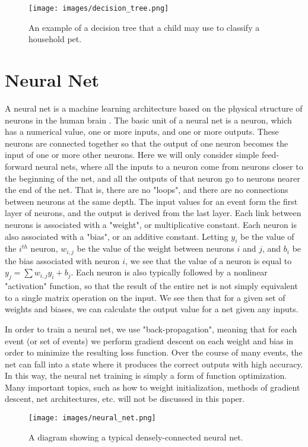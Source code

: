\begin{figure}[t]
    \centering
    \texttt{[image: images/decision\_tree.png]}
    \caption{An example of a decision tree that a child may use to classify a household pet.}
    \label{decision_tree}
\end{figure}

\section{Neural Net}

A neural net is a machine learning architecture based on the physical structure of neurons in the human brain \cite{neural_net}. The basic unit of a neural net is a neuron, which has a numerical value, one or more inputs, and one or more outputs. These neurons are connected together so that the output of one neuron becomes the input of one or more other neurons. Here we will only consider simple feed-forward neural nets, where all the inputs to a neuron come from neurons closer to the beginning of the net, and all the outputs of that neuron go to neurons nearer the end of the net. That is, there are no "loops", and there are no connections between neurons at the same depth. The input values for an event form the first layer of neurons, and the output is derived from the last layer. Each link between neurons is associated with a "weight", or multiplicative constant. Each neuron is also associated with a "bias", or an additive constant. Letting $y_i$ be the value of the $i^{th}$ neuron, $w_{i,j}$ be the value of the weight between neurons $i$ and $j$, and $b_i$ be the bias associated with neuron $i$, we see that the value of a neuron is equal to $y_j = \sum{w_{i,j}y_i} + b_j$. Each neuron is also typically followed by a nonlinear "activation" function, so that the result of the entire net is not simply equivalent to a single matrix operation on the input. We see then that for a given set of weights and biases, we can calculate the output value for a net given any inputs.

In order to train a neural net, we use "back-propagation", meaning that for each event (or set of events) we perform gradient descent on each weight and bias in order to minimize the resulting loss function. Over the course of many events, the net can fall into a state where it produces the correct outputs with high accuracy. In this way, the neural net training is simply a form of function optimization. Many important topics, such as how to weight initialization, methods of gradient descent, net architectures, etc. will not be discussed in this paper.

\begin{figure}[t]
    \centering
    \texttt{[image: images/neural\_net.png]}
    \caption{A diagram showing a typical densely-connected neural net.}
    \label{neural_net}
\end{figure}